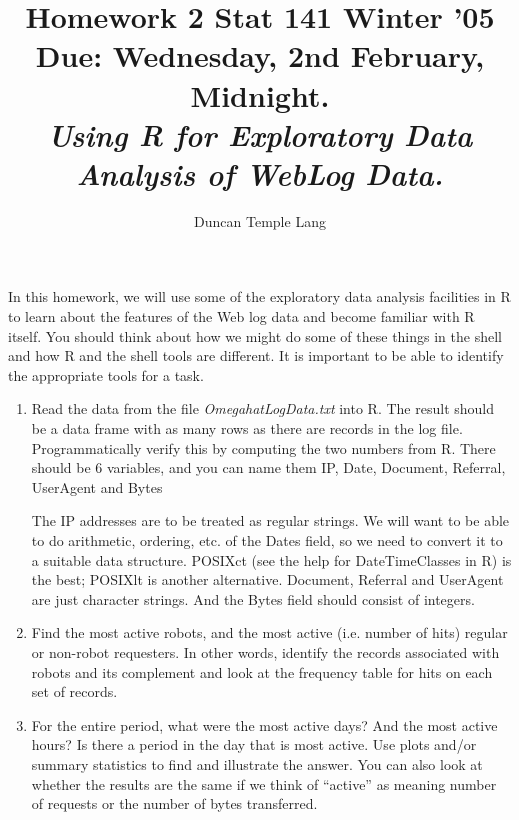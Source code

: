 \documentclass[12pt]{article}
\title{Homework 2 \hfill Stat 141 Winter '05 \\
Due:  Wednesday, 2nd February, Midnight.  \\
\textit{Using R for Exploratory Data Analysis of
WebLog Data.}
}
\author{Duncan Temple Lang}
\begin{document}
\maketitle



In this homework, we will use 
some of the exploratory
data analysis facilities in
R to learn about the features
of the Web log data and become familiar
with R itself.
You should think about how we might do
some of these things in the shell
and how R and the shell tools are different.
It is important to be able to 
identify the appropriate tools for a task.


\begin{enumerate}

\item Read the data from the file \textsl{OmegahatLogData.txt}
into R.
The result should be a data frame with as many rows as there are
records in the log file. Programmatically verify this
by computing the two numbers from R.
There should be 6 variables, and you can name them 
IP, Date, Document, Referral, UserAgent and Bytes

The IP addresses are to be treated as regular strings.
We will want to be able to do arithmetic, ordering, etc.
of the Dates field, so we need to convert it to a suitable data structure.
POSIXct (see the help for DateTimeClasses in R) is
the best;  POSIXlt is another alternative.
Document, Referral and UserAgent are just character strings.
And the Bytes field should consist of  integers.


\item Find the most active robots, and the most active 
(i.e. number of hits)
regular or non-robot requesters.  In other words, identify
the records associated with robots and its complement
and look at the frequency table for hits on each set of records.


\item 
For the entire period,  what were the most active days?
And the most active hours? Is there a period in the day that is most active.
Use plots and/or summary statistics to find and illustrate
the answer.
You can also look at whether the results are the same
if we think of ``active'' as meaning
number of requests or the number of bytes transferred.


\begin{comment}
\item  What are the common Web browsers being used
when accessing this site?  Look at this by
browser and operating system combinations.
You want to look only at non-robot records.
\end{comment}



\end{enumerate}
\end{document}
